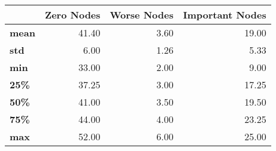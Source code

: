 \begin{tabular}{lrrr}
\toprule
{} &  Zero Nodes &  Worse Nodes &  Important Nodes \\
\midrule
\textbf{mean} &       41.40 &         3.60 &            19.00 \\
\textbf{std } &        6.00 &         1.26 &             5.33 \\
\textbf{min } &       33.00 &         2.00 &             9.00 \\
\textbf{25\% } &       37.25 &         3.00 &            17.25 \\
\textbf{50\% } &       41.00 &         3.50 &            19.50 \\
\textbf{75\% } &       44.00 &         4.00 &            23.25 \\
\textbf{max } &       52.00 &         6.00 &            25.00 \\
\bottomrule
\end{tabular}
